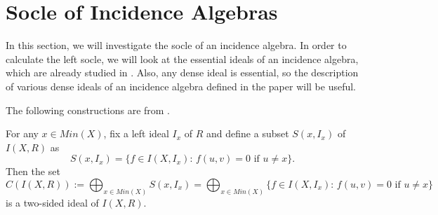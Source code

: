 \documentclass[12pt]{article}
\begin{document}

\section{Socle of Incidence Algebras}


In this section, we will investigate the socle of an incidence algebra. In order to calculate the left socle, we will look at the
essential ideals of an incidence algebra, which are already studied in \cite{S:Essential}. Also, any dense ideal is essential, so the description of various dense ideals 
of an incidence algebra defined in the paper \cite{K:Dense} will be useful.

The following constructions are from \cite{K:Dense}. 

For any $x \in Min(X)$, fix a left ideal $I_x$ of $R$ and define a subset $%
S(x,I_x)$ of ${I(X,R)}$ as 
\begin{equation*}
S(x,I_x) = \{f \in I(X,I_x) : \, f(u,v) = 0 \mbox{ if } u \neq x \}.
\end{equation*}
Then the set 
\begin{equation*}
C({I(X,R)}) := \bigoplus_{x \in Min(X)}S(x,I_x) = \bigoplus_{x \in Min(X)}
\{f \in I(X,I_x) : \, f(u,v) = 0 \mbox{ if } u \neq x \}
\end{equation*}
is a two-sided ideal of ${I(X,R)}$.

%
%

\end{document}
